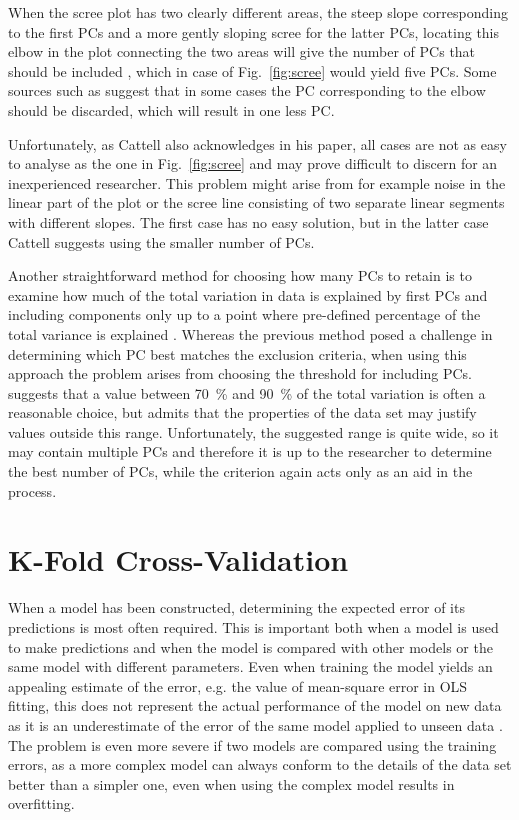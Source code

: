 \documentclass[english, twoside]{HYgradu}
\begin{document}
When the scree plot has two clearly different areas, the steep slope corresponding to the first PCs and a more gently sloping scree for the latter PCs, locating this elbow in the plot connecting the two areas will give the number of PCs that should be included \citep{jolliffe2002principal}, which in case of Fig.\ \ref{fig:scree} would yield five PCs. Some sources such as \citep{cattell1966scree} suggest that in some cases the PC corresponding to the elbow should be discarded, which will result in one less PC.

Unfortunately, as Cattell also acknowledges in his paper, all cases are not as easy to analyse as the one in Fig.\ \ref{fig:scree} and may prove difficult to discern for an inexperienced researcher. This problem might arise from for example noise in the linear part of the plot or the scree line consisting of two separate linear segments with different slopes. The first case has no easy solution, but in the latter case Cattell suggests using the smaller number of PCs.

Another straightforward method for choosing how many PCs to retain is to examine how much of the total variation in data is explained by first PCs and including components only up to a point where pre-defined percentage of the total variance is explained \citep{jolliffe2002principal}. Whereas the previous method posed a challenge in determining which PC best matches the exclusion criteria, when using this approach the problem arises from choosing the threshold for including PCs. \citet{jolliffe2002principal} suggests that a value between 70~\% and 90~\% of the total variation is often a reasonable choice, but admits that the properties of the data set may justify values outside this range. Unfortunately, the suggested range is quite wide, so it may contain multiple PCs and therefore it is up to the researcher to determine the best number of PCs, while the criterion again acts only as an aid in the process. 


\section{K-Fold Cross-Validation} \label{sect:cross-validation}
When a model has been constructed, determining the expected error of its predictions is most often required. This is important both when a model is used to make predictions and when the model is compared with other models or the same model with different parameters. Even when training the model yields an appealing estimate of the error, e.g. the value of mean-square error in OLS fitting, this does not represent the actual performance of the model on new data as it is an underestimate of the error of the same model applied to unseen data \citep{alpaydin2014introduction}. The problem is even more severe if two models are compared using the training errors, as a more complex model can always conform to the details of the data set better than a simpler one, even when using the complex model results in overfitting.
\end{document}
